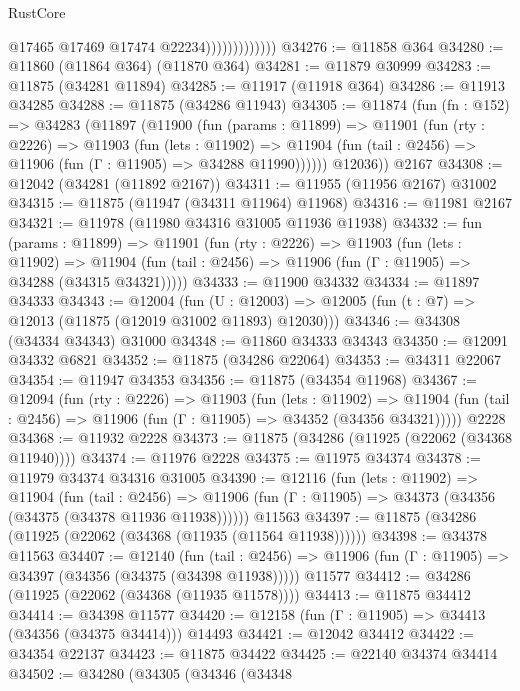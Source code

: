 \begin{lexlean}{RustCore}
\begin{coremodule}
                              @17465
                              @17469
                              @17474
                              @22234)))))))))))))
@34276 := @11858 @364
@34280 := @11860 (@11864 @364) (@11870 @364)
@34281 := @11879 @30999
@34283 := @11875 (@34281 @11894)
@34285 := @11917 (@11918 @364)
@34286 := @11913 @34285
@34288 := @11875 (@34286 @11943)
@34305 := @11874
    (fun (fn : @152) =>
    @34283
      (@11897
        (@11900
          (fun (params : @11899) =>
          @11901
            (fun (rty : @2226) =>
            @11903
              (fun (lets : @11902) =>
              @11904 (fun (tail : @2456) => @11906 (fun (Γ : @11905) => @34288 @11990))))))
        @12036))
    @2167
@34308 := @12042 (@34281 (@11892 @2167))
@34311 := @11955 (@11956 @2167) @31002
@34315 := @11875 (@11947 (@34311 @11964) @11968)
@34316 := @11981 @2167
@34321 := @11978 (@11980 @34316 @31005 @11936 @11938)
@34332 := fun (params : @11899) =>
  @11901
    (fun (rty : @2226) =>
    @11903
      (fun (lets : @11902) =>
      @11904 (fun (tail : @2456) => @11906 (fun (Γ : @11905) => @34288 (@34315 @34321)))))
@34333 := @11900 @34332
@34334 := @11897 @34333
@34343 := @12004
    (fun (U : @12003) => @12005 (fun (t : @7) => @12013 (@11875 (@12019 @31002 @11893) @12030)))
@34346 := @34308 (@34334 @34343) @31000
@34348 := @11860 @34333 @34343
@34350 := @12091 @34332 @6821
@34352 := @11875 (@34286 @22064)
@34353 := @34311 @22067
@34354 := @11947 @34353
@34356 := @11875 (@34354 @11968)
@34367 := @12094
    (fun (rty : @2226) =>
    @11903
      (fun (lets : @11902) =>
      @11904 (fun (tail : @2456) => @11906 (fun (Γ : @11905) => @34352 (@34356 @34321)))))
    @2228
@34368 := @11932 @2228
@34373 := @11875 (@34286 (@11925 (@22062 (@34368 @11940))))
@34374 := @11976 @2228
@34375 := @11975 @34374
@34378 := @11979 @34374 @34316 @31005
@34390 := @12116
    (fun (lets : @11902) =>
    @11904
      (fun (tail : @2456) =>
      @11906 (fun (Γ : @11905) => @34373 (@34356 (@34375 (@34378 @11936 @11938))))))
    @11563
@34397 := @11875 (@34286 (@11925 (@22062 (@34368 (@11935 (@11564 @11938))))))
@34398 := @34378 @11563
@34407 := @12140
    (fun (tail : @2456) => @11906 (fun (Γ : @11905) => @34397 (@34356 (@34375 (@34398 @11938)))))
    @11577
@34412 := @34286 (@11925 (@22062 (@34368 (@11935 @11578))))
@34413 := @11875 @34412
@34414 := @34398 @11577
@34420 := @12158 (fun (Γ : @11905) => @34413 (@34356 (@34375 @34414))) @14493
@34421 := @12042 @34412
@34422 := @34354 @22137
@34423 := @11875 @34422
@34425 := @22140 @34374 @34414
@34502 := @34280
    (@34305
      (@34346
        (@34348

\end{coremodule}
\end{lexlean}
